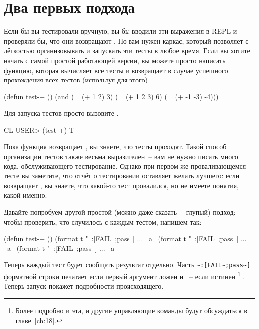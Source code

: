 \section{Два первых подхода}

Если бы вы тестировали вручную, вы бы вводили эти выражения в REPL и проверяли бы, что они
возвращают . Но вам нужен каркас, который позволяет с лёгкостью организовывать и
запускать эти тесты в любое время. Если вы хотите начать с самой простой работающей
версии, вы можете просто написать функцию, которая вычисляет все тесты и возвращает
 в случае успешного прохождения всех тестов (используя  для этого).

\begin{myverb}
(defun test-+ ()
  (and
    (= (+ 1 2) 3)
    (= (+ 1 2 3) 6)
    (= (+ -1 -3) -4)))
\end{myverb}

Для запуска тестов просто вызовите .

\begin{myverb}
CL-USER> (test-+)
T
\end{myverb}

Пока функция возвращает , вы знаете, что тесты проходят. Такой способ организации
тестов также весьма выразителен~-- вам не нужно писать много кода, обслуживающего
тестирование. Однако при первом же проваливающемся тесте вы заметите, что отчёт о
тестировании оставляет желать лучшего: если  возвращает , вы
знаете, что какой-то тест провалился, но не имеете понятия, какой именно.

Давайте попробуем другой простой (можно даже сказать~-- глупый) подход: чтобы проверить,
что случилось с каждым тестом, напишем так:

\begin{myverb}
(defun test-+ ()
  (format t "~:[FAIL~;pass~] ... ~a~%
  (format t "~:[FAIL~;pass~] ... ~a~%
  (format t "~:[FAIL~;pass~] ... ~a~%
\end{myverb}

Теперь каждый тест будет сообщать результат отдельно. Часть \lstinline!~:[FAIL~;pass~]!
форматной строки  печатает  если первый аргумент ложен и
~-- если истинен \footnote{Более подробно и эта, и другие управляющие команды
   будут обсуждаться в главе~\ref{ch:18}.} . Теперь запуск 
покажет подробности происходящего.

